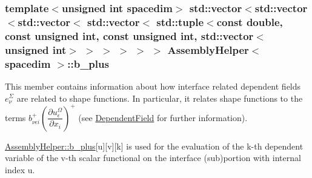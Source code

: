 \subsubsection[{\texorpdfstring{b\+\_\+plus}{b_plus}}]{\setlength{\rightskip}{0pt plus 5cm}template$<$unsigned int spacedim$>$ std\+::vector$<$std\+::vector$<$std\+::vector$<$ std\+::vector$<$ std\+::tuple$<$const double, const unsigned int, const unsigned int, std\+::vector$<$unsigned int$>$ $>$ $>$ $>$ $>$ $>$ {\bf Assembly\+Helper}$<$ spacedim $>$\+::b\+\_\+plus\hspace{0.3cm}{\ttfamily [private]}}\hypertarget{class_assembly_helper_ab09dd07d3ec596525be83f8f5859bef7}{}\label{class_assembly_helper_ab09dd07d3ec596525be83f8f5859bef7}
This member contains information about how interface related dependent fields $e^\Sigma_\nu$ are related to shape functions. In particular, it relates shape functions to the terms $b^+_{\nu\epsilon i} \left(\dfrac{\partial u^\Omega_\epsilon}{\partial x_i}\right)^+$ (see \hyperlink{class_dependent_field}{Dependent\+Field} for further information).

\hyperlink{class_assembly_helper_ab09dd07d3ec596525be83f8f5859bef7}{Assembly\+Helper\+::b\+\_\+plus}\mbox{[}{\ttfamily u}\mbox{]}\mbox{[}{\ttfamily v}\mbox{]}\mbox{[}{\ttfamily k}\mbox{]} is used for the evaluation of the {\ttfamily k-\/th} dependent variable of the {\ttfamily v-\/th} scalar functional on the interface (sub)portion with internal index {\ttfamily u}.

